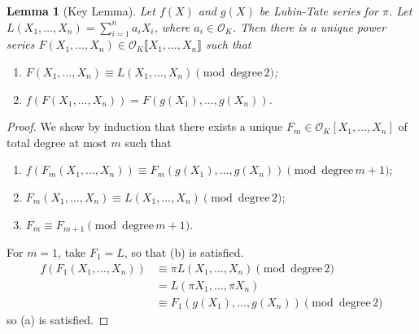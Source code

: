 \documentclass[11pt]{article}
\theoremstyle{definition}
\theoremstyle{plain}
\newtheorem{lemma}[definition]{Lemma}
\theoremstyle{remark}
\newcommand{\cO}{\mathcal{O}}
\begin{document}
\begin{lemma}[Key Lemma]\label{lem:19_4}
    Let $f(X)$ and $g(X)$ be Lubin-Tate series for $\pi$. Let $L(X_1, \ldots, X_n) = \sum_{i=1}^n a_i X_i$, where $a_i \in \cO_K$. Then there is a unique power series $F(X_1, \ldots, X_n) \in \cO_K \llbracket X_1, \ldots, X_n \rrbracket$ such that
    \begin{enumerate}
        \item $F(X_1, \ldots, X_n) \equiv L(X_1, \ldots, X_n) \pmod{\mathrm{degree}\,2}$;
        \item $f(F(X_1, \ldots, X_n)) = F(g(X_1), \ldots, g(X_n))$.
    \end{enumerate}
\end{lemma}
\begin{proof}
    We show by induction that there exists a unique $F_m \in \cO_K[X_1, \ldots, X_n]$ of total degree at most $m$ such that
    \begin{enumerate}[label=(\alph*)]
        \item $f(F_m(X_1, \ldots, X_n)) \equiv F_m(g(X_1), \ldots, g(X_n)) \pmod{\mathrm{degree}\,m + 1}$;
        \item $F_m(X_1, \ldots, X_n) \equiv L(X_1, \ldots, X_n) \pmod{\mathrm{degree}\,2}$;
        \item $F_m \equiv F_{m+1} \pmod{\mathrm{degree}\,m+1}$.
    \end{enumerate}
    For $m = 1$, take $F_1 = L$, so that (b) is satisfied.
    \begin{align*}
        f(F_1(X_1, \ldots, X_n))
        &\equiv \pi L(X_1, \ldots, X_n) \pmod{\mathrm{degree}\,2}\\
        &= L(\pi X_1, \ldots, \pi X_n)\\
        &\equiv F_1(g(X_1), \ldots, g(X_n)) \pmod{\mathrm{degree}\,2}
    \end{align*}
    so (a) is satisfied.


\end{proof}
\end{document}
